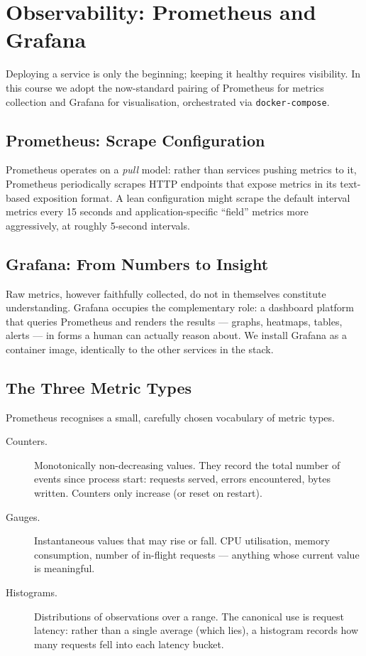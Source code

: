 \documentclass[11pt,a4paper]{article}
\theoremstyle{definition}
\theoremstyle{remark}
\begin{document}
\section{Observability: Prometheus and Grafana}


Deploying a service is only the beginning; keeping it healthy requires visibility. In this course we adopt the now-standard pairing of Prometheus for metrics collection and Grafana for visualisation, orchestrated via \texttt{docker-compose}.

\subsection{Prometheus: Scrape Configuration}

Prometheus operates on a \emph{pull} model: rather than services pushing metrics to it, Prometheus periodically scrapes HTTP endpoints that expose metrics in its text-based exposition format. A lean configuration might scrape the default interval metrics every 15 seconds and application-specific ``field'' metrics more aggressively, at roughly 5-second intervals.

\subsection{Grafana: From Numbers to Insight}

Raw metrics, however faithfully collected, do not in themselves constitute understanding. Grafana occupies the complementary role: a dashboard platform that queries Prometheus and renders the results --- graphs, heatmaps, tables, alerts --- in forms a human can actually reason about. We install Grafana as a container image, identically to the other services in the stack.

\subsection{The Three Metric Types}

Prometheus recognises a small, carefully chosen vocabulary of metric types.

\begin{description}
    \item[Counters.] Monotonically non-decreasing values. They record the total number of events since process start: requests served, errors encountered, bytes written. Counters only increase (or reset on restart).
    \item[Gauges.] Instantaneous values that may rise or fall. CPU utilisation, memory consumption, number of in-flight requests --- anything whose current value is meaningful.
    \item[Histograms.] Distributions of observations over a range. The canonical use is request latency: rather than a single average (which lies), a histogram records how many requests fell into each latency bucket.
\end{description}
\end{document}
